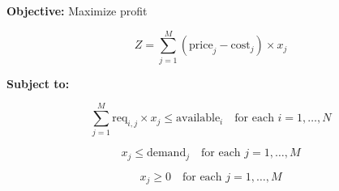 \documentclass{article}
\begin{document}
\textbf{Objective:} Maximize profit

\[
Z = \sum_{j=1}^{M} (\text{price}_j - \text{cost}_j) \times x_j
\]

\textbf{Subject to:}

\[
\sum_{j=1}^{M} \text{req}_{i,j} \times x_j \leq \text{available}_i \quad \text{for each } i = 1, \ldots, N
\]

\[
x_j \leq \text{demand}_j \quad \text{for each } j = 1, \ldots, M
\]

\[
x_j \geq 0 \quad \text{for each } j = 1, \ldots, M
\]
\end{document}
